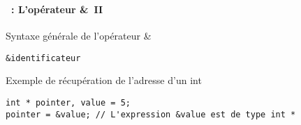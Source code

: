 \begin{frame}[containsverbatim]
  \frametitle{\secname}
  \framesubtitle{\subsecname~: L'opérateur \&~II}

  \begin{block}{Syntaxe générale de l'opérateur \&}
    \begin{verbatim}
&identificateur\end{verbatim}
  \end{block}
  \begin{exampleblock}{Exemple de récupération de l'adresse d'un int}
    \begin{verbatim}
int * pointer, value = 5;
pointer = &value; // L'expression &value est de type int *\end{verbatim}
  \end{exampleblock}  
\end{frame}

